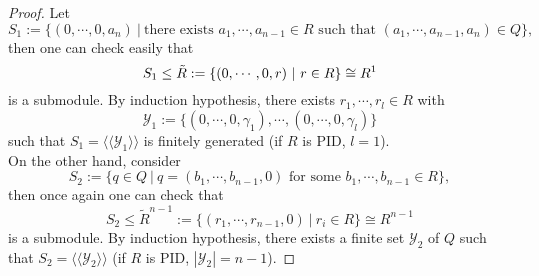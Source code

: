 \documentclass[12pt]{amsbook}
\begin{document}
\begin{proof}
    Let
    $$S_1:=\{(0,\cdots,0,a_n)\ |\ \text{there exists }a_1,\cdots,a_{n-1}\in R\text{ such that }(a_1,\cdots,a_{n-1},a_n)\in Q\},$$
    then one can check easily that
    $$S_1\leq\Tilde{R}:=\{(0,\cdots,0,r)\ |\ r\in R\}\cong R^1$$
    is a submodule. By induction hypothesis, there exists $r_1,\cdots,r_l\in R$ with
    $$\mathcal{Y}_1:=\{(0,\cdots,0,\gamma_1),\cdots,(0,\cdots,0,\gamma_l)\}$$
    such that $S_1=\langle\langle\mathcal{Y}_1\rangle\rangle$ is finitely generated (if $R$ is PID, $l=1$).\\
    On the other hand, consider
    $$S_2:=\{q\in Q\ |\ q=(b_1,\cdots,b_{n-1},0)\text{ for some }b_1,\cdots,b_{n-1}\in R\},$$
    then once again one can check that
    $$S_2\leq\widetilde{R}^{n-1}:=\{(r_1,\cdots,r_{n-1},0)\ |\ r_i\in R\}\cong R^{n-1}$$
    is a submodule. By induction hypothesis, there exists a finite set $\mathcal{Y}_2$ of $Q$ such that $S_2=\langle\langle\mathcal{Y}_2\rangle\rangle$ (if $R$ is PID, $|\mathcal{Y}_2|=n-1$).


\end{proof}
\end{document}

